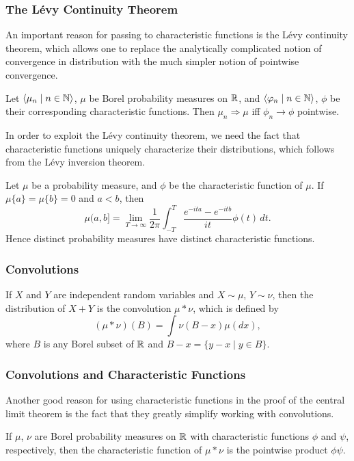 \documentclass{beamer}
\newcommand\bldseq[2]{\langle{#1}\mid{#2}\rangle}
\newcommand\bldset[2]{\{{#1}\mid{#2}\}}
\begin{document}
\begin{frame}
\frametitle{The L\'evy Continuity Theorem}
An important reason for passing to characteristic functions is the L\'evy continuity theorem, which allows one to replace the analytically complicated notion of convergence in distribution with the much simpler notion of pointwise convergence. \pause

\begin{theorem}
Let $\bldseq{\mu_n}{n \in \N}$, $\mu$ be Borel probability measures on $\mathbb{R}$, and $\bldseq{\phi_n}{n \in \N}$, $\phi$ be their corresponding characteristic functions. Then $\mu_n \Rightarrow \mu$ iff $\phi_n \rightarrow \phi$ pointwise.
\end{theorem}
\end{frame}

\begin{frame}
In order to exploit the L\'evy continuity theorem, we need the fact that characteristic functions uniquely characterize their distributions, which follows from the L\'evy inversion theorem. \pause

\begin{theorem}
Let $\mu$ be a probability measure, and $\phi$ be the characteristic function of $\mu$. If $\mu \{a\} = \mu \{b\} = 0$ and $a < b$, then
\[ \mu (a,b] = \lim_{T \rightarrow \infty} \frac{1}{2\pi} \int_{-T}^T \frac{e^{-ita} - e^{-itb}}{it} \phi(t) \, dt. \]
Hence distinct probability measures have distinct characteristic functions.
\end{theorem}
\end{frame}

\begin{frame}
\frametitle{Convolutions}
If $X$ and $Y$ are independent random variables and $X \sim \mu$, $Y \sim \nu$, then the distribution of $X + Y$ is the convolution $\mu * \nu$, which is defined by
\[ (\mu * \nu)(B) = \int \nu(B - x) \mu(dx), \]
where $B$ is any Borel subset of $\mathbb{R}$ and $B - x = \bldset{y - x}{y \in B}$.
\end{frame}

\begin{frame}
\frametitle{Convolutions and Characteristic Functions}
Another good reason for using characteristic functions in the proof of the central limit theorem is the fact that they greatly simplify working with convolutions. \pause

\begin{lemma}
If $\mu$, $\nu$ are Borel probability measures on $\mathbb{R}$ with characteristic functions $\phi$ and $\psi$, respectively, then the characteristic function of $\mu * \nu$ is the pointwise product $\phi\psi$.
\end{lemma}
\end{frame}
\end{document}

